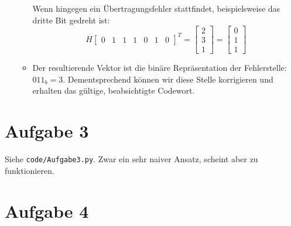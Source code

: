 \documentclass[11pt]{article} %
\theoremstyle{definition}
\begin{document}
\begin{enumerate}[1.]
\begin{itemize}
Wenn hingegen ein Übertragungsfehler stattfindet, beispielsweise das dritte Bit gedreht ist:
\[
H \begin{bmatrix}
0 & 1 & 1 & 1 & 0 & 1 & 0
\end{bmatrix}^T = \begin{bmatrix} 2 \\ 3 \\ 1 \end{bmatrix} = \begin{bmatrix} 0 \\ 1 \\ 1\end{bmatrix}
\]

\item Der resultierende Vektor ist die binäre Repräsentation der Fehlerstelle: $011_b = 3$. Dementsprechend können wir diese Stelle korrigieren und erhalten das gültige, beabsichtigte Codewort.

\end{itemize}
\end{enumerate}

\section*{Aufgabe 3}

Siehe {\tt code/Aufgabe3.py}. Zwar ein sehr naiver Ansatz, scheint aber zu funktionieren.

\section*{Aufgabe 4}
\end{document}
